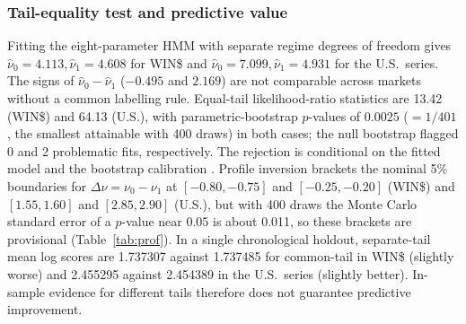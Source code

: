 \documentclass[11pt,a4paper]{article}
\theoremstyle{plain}
\theoremstyle{remark}
\begin{document}
\subsubsection{Tail-equality test and predictive value}
Fitting the eight-parameter HMM with separate regime degrees of freedom gives $\hat\nu_0=4.113,\hat\nu_1=4.608$ for WIN\$ and $\hat\nu_0=7.099,\hat\nu_1=4.931$ for the U.S.\ series. The signs of $\hat\nu_0-\hat\nu_1$ ($-0.495$ and $2.169$) are not comparable across markets without a common labelling rule. Equal-tail likelihood-ratio statistics are 13.42 (WIN\$) and 64.13 (U.S.), with parametric-bootstrap $p$-values of $0.0025$ ($=1/401$, the smallest attainable with 400 draws) in both cases; the null bootstrap flagged 0 and 2 problematic fits, respectively. The rejection is conditional on the fitted model and the bootstrap calibration \citep[cf.][]{hansen1992}. Profile inversion brackets the nominal 5\% boundaries for $\Delta\nu=\nu_0-\nu_1$ at $[-0.80,-0.75]$ and $[-0.25,-0.20]$ (WIN\$) and $[1.55,1.60]$ and $[2.85,2.90]$ (U.S.), but with 400 draws the Monte Carlo standard error of a $p$-value near 0.05 is about 0.011, so these brackets are provisional (Table~\ref{tab:prof}). In a single chronological holdout, separate-tail mean log scores are 1.737307 against 1.737485 for common-tail in WIN\$ (slightly worse) and 2.455295 against 2.454389 in the U.S.\ series (slightly better). In-sample evidence for different tails therefore does not guarantee predictive improvement.
\end{document}
